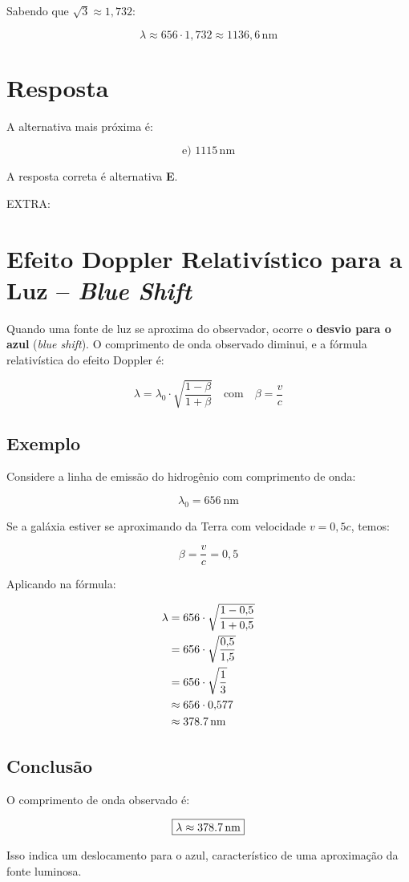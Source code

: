 \documentclass[a4paper,12pt]{article}
\begin{document}
\begin{flushleft}
Sabendo que \( \sqrt{3} \approx 1{,}732 \):

\[
\lambda \approx 656 \cdot 1{,}732 \approx 1136{,}6\,\text{nm}
\]

\section*{Resposta}

A alternativa mais próxima é:

\[
\boxed{\text{e) } 1115\,\text{nm}}
\]

A resposta correta é alternativa \colorbox{green!50}{\textbf{E}}.


EXTRA:

\section*{Efeito Doppler Relativístico para a Luz – \textit{Blue Shift}}

Quando uma fonte de luz se aproxima do observador, ocorre o \textbf{desvio para o azul} (\textit{blue shift}). O comprimento de onda observado diminui, e a fórmula relativística do efeito Doppler é:

\begin{equation}
\lambda = \lambda_0 \cdot \sqrt{\frac{1 - \beta}{1 + \beta}} \quad \text{com} \quad \beta = \frac{v}{c}
\end{equation}

\subsection*{Exemplo}

Considere a linha de emissão do hidrogênio com comprimento de onda:

\[
\lambda_0 = \SI{656}{\nano\meter}
\]

Se a galáxia estiver se aproximando da Terra com velocidade \( v = 0{,}5c \), temos:

\[
\beta = \frac{v}{c} = 0{,}5
\]

Aplicando na fórmula:

\begin{align*}
\lambda &= 656 \cdot \sqrt{\frac{1 - 0{,}5}{1 + 0{,}5}} \\
        &= 656 \cdot \sqrt{\frac{0{,}5}{1{,}5}} \\
        &= 656 \cdot \sqrt{\frac{1}{3}} \\
        &\approx 656 \cdot 0{,}577 \\
        &\approx \SI{378{,}7}{\nano\meter}
\end{align*}

\subsection*{Conclusão}

O comprimento de onda observado é:

\[
\boxed{\lambda \approx \SI{378{,}7}{\nano\meter}}
\]

Isso indica um deslocamento para o azul, característico de uma aproximação da fonte luminosa.
\end{flushleft}
\end{document}
